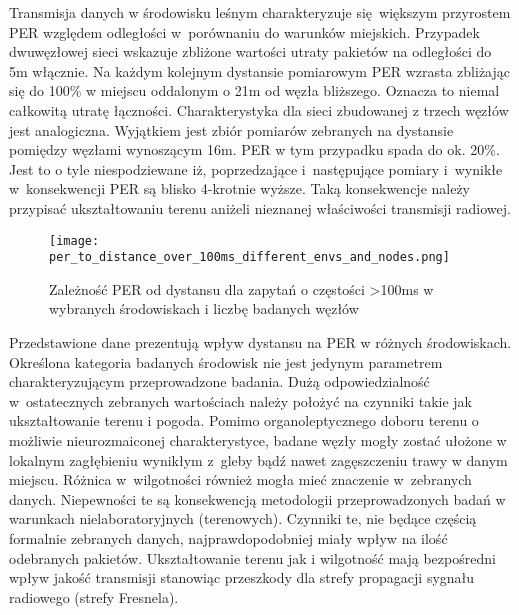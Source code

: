Transmisja danych w środowisku leśnym charakteryzuje się większym przyrostem PER względem odległości w~porównaniu do warunków miejskich.
Przypadek dwuwęzłowej sieci wskazuje zbliżone wartości utraty pakietów na odległości do 5m włącznie. Na każdym kolejnym dystansie
pomiarowym PER wzrasta zbliżając się do 100\% w miejscu oddalonym o 21m od węzła bliższego. Oznacza to niemal całkowitą utratę łączności.
Charakterystyka dla sieci zbudowanej z trzech węzłów jest analogiczna. Wyjątkiem jest zbiór pomiarów zebranych na dystansie pomiędzy węzłami
wynoszącym 16m. PER w tym przypadku spada do ok. 20\%. Jest to o tyle niespodziewane iż, poprzedzające i~następujące pomiary i~wynikłe
w~konsekwencji PER są blisko 4-krotnie wyższe. Taką konsekwencje należy przypisać ukształtowaniu terenu aniżeli nieznanej właściwości
transmisji radiowej.

\begin{figure}[!htb]
	\centering \texttt{[image: per\_to\_distance\_over\_100ms\_different\_envs\_and\_nodes.png]}
	\caption{Zależność \gls{PER} od dystansu dla zapytań o częstości >100ms w wybranych środowiskach i liczbę badanych węzłów}
	\label{rys:per_to_distance_over_100ms_different_envs_and_nodes}
\end{figure}


Przedstawione dane prezentują wpływ dystansu na PER w różnych środowiskach. Określona kategoria badanych środowisk nie jest jedynym
parametrem charakteryzującym przeprowadzone badania. Dużą odpowiedzialność w~ostatecznych zebranych wartościach należy położyć
na czynniki takie jak ukształtowanie terenu i pogoda. Pomimo organoleptycznego doboru terenu o możliwie nieurozmaiconej charakterystyce,
badane węzły mogły zostać ułożone w lokalnym zagłębieniu wynikłym z~gleby bądź nawet zagęszczeniu trawy w danym miejscu. Różnica
w~wilgotności również mogła mieć znaczenie w~zebranych danych. Niepewności te są konsekwencją metodologii przeprowadzonych
badań w warunkach nielaboratoryjnych (terenowych). Czynniki te, nie będące częścią formalnie zebranych danych, najprawdopodobniej
miały wpływ na ilość odebranych pakietów. Ukształtowanie terenu jak i wilgotność mają bezpośredni wpływ jakość transmisji stanowiąc
przeszkody dla strefy propagacji sygnału radiowego (strefy Fresnela).

